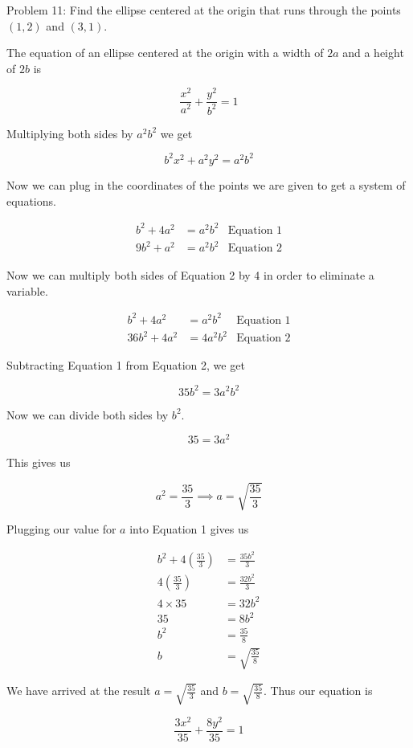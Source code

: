 Problem 11: Find the ellipse centered at the origin that runs through the points $(1, 2)$ and $(3, 1)$.

The equation of an ellipse centered at the origin with a width of $2a$ and a height of $2b$ is

$$\frac{x^2}{a^2} + \frac{y^2}{b^2} = 1$$

Multiplying both sides by $a^2 b^2$ we get

$$b^2 x^2 + a^2 y^2 = a^2 b^2 $$

Now we can plug in the coordinates of the points we are given to get a system of equations.

\begin{align*}
b^2 + 4a^2 &= a^2 b^2 & \text{Equation 1} \\
9 b^2 + a^2 &= a^2 b^2 & \text{Equation 2}
\end{align*}

Now we can multiply both sides of Equation 2 by 4 in order to eliminate a variable.

\begin{align*}
b^2 + 4a^2 &= a^2 b^2 & \text{Equation 1} \\
36 b^2 + 4a^2 &= 4a^2 b^2 & \text{Equation 2}
\end{align*}

Subtracting Equation 1 from Equation 2, we get

$$ 35b^2 = 3a^2b^2 $$

Now we can divide both sides by $b^2$.

$$ 35 = 3a^2 $$

This gives us

$$ a^2 = \frac{35}{3} \implies a = \sqrt{\frac{35}{3}} $$

Plugging our value for $a$ into Equation 1 gives us

\begin{align*}
b^2 + 4\left(\frac{35}{3}\right) &= \frac{35b^2}{3} \\
4\left(\frac{35}{3}\right) &= \frac{32b^2}{3} \\
4 \times 35 &= 32 b^2 \\
35 &= 8 b^2 \\
b^2 &= \frac{35}{8} \\
b &= \sqrt{\frac{35}{8}}
\end{align*}

We have arrived at the result $\displaystyle a = \sqrt{\frac{35}{3}}$ and $\displaystyle b = \sqrt{\frac{35}{8}}$. Thus our equation is

$$ \boxed{\frac{3x^2}{35} + \frac{8y^2}{35} = 1} $$
